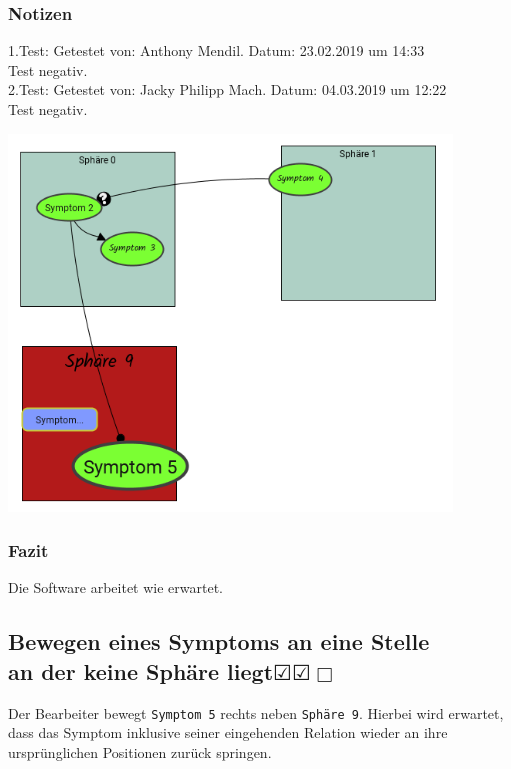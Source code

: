 \documentclass[enabledeprecatedfontcommands]{scrartcl}
\newcommand{\subsectiont}[2]{\subsection[#1]{#1{\normalsize\normalfont #2}}}
\newcommand{\leer}{$\Box$}
\newcommand{\ok}{$\CheckedBox$}
\begin{document}
\subsubsection{Notizen}
1.Test: Getestet von: Anthony Mendil. Datum: 23.02.2019 um 14:33 \\
Test negativ.\\
2.Test: Getestet von: Jacky Philipp Mach. Datum: 04.03.2019 um 12:22 \\
Test negativ.
\begin{center}
\includegraphics[height=10cm]{2_31.PNG}
\end{center}
\subsubsection{Fazit}
Die Software arbeitet wie erwartet.

\subsectiont{Bewegen eines Symptoms an eine Stelle \\an der keine Sphäre liegt}{\dotfill\ok\ok\leer}
Der Bearbeiter bewegt \texttt{Symptom 5} rechts neben \texttt{Sphäre 9}. Hierbei wird erwartet, dass das Symptom inklusive seiner eingehenden Relation wieder an ihre ursprünglichen Positionen zurück springen. 
\end{document}
